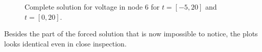 \begin{figure}[H]
\hspace{-10mm}
  \caption{Complete solution for voltage in node 6 for $t=[-5,20]$ and $t=[0,20]$.} 
\end{figure}

Besides the part of the forced solution that is now impossible to notice, the plots looks identical even in close inspection.

